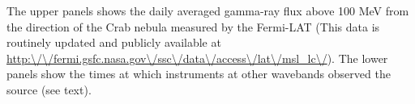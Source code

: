 The upper panels shows the daily averaged gamma-ray flux above 100 MeV from the direction of the Crab nebula measured by the Fermi-LAT (This data is routinely updated and publicly available at \url{http:\/\/fermi.gsfc.nasa.gov\/ssc\/data\/access\/lat\/msl\_lc\/}). The lower panels show the times at which instruments at other wavebands observed the source (see text).\label{fig:lc}